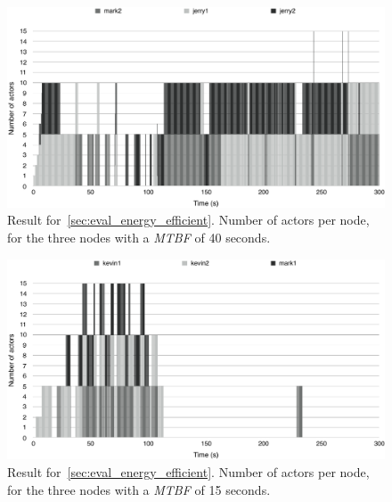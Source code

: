 \documentclass{cslthse-msc}
\begin{document}
\begin{figure}[!hbt]
\centering
\includegraphics[scale=0.5]{images/results/energy_efficient/MTBF_40.pdf}
\caption[Number of replicas per node in~\cref{sec:eval_energy_efficient} for nodes with \emph{MTBF} = 40 s]{Result for~\cref{sec:eval_energy_efficient}. Number of actors per node, for the three nodes with a \emph{MTBF} of 40 seconds.} \label{fig:eval_energy_efficient_mtbf_40}
\end{figure}

\begin{figure}[!hbt]
\centering
\includegraphics[scale=0.5]{images/results/energy_efficient/MTBF_15.pdf}
\caption[Number of replicas per node in~\cref{sec:eval_energy_efficient} for nodes with \emph{MTBF} = 15 s]{Result for~\cref{sec:eval_energy_efficient}. Number of actors per node, for the three nodes with a \emph{MTBF} of 15 seconds.} \label{fig:eval_energy_efficient_mtbf_15}
\end{figure}
\end{document}
